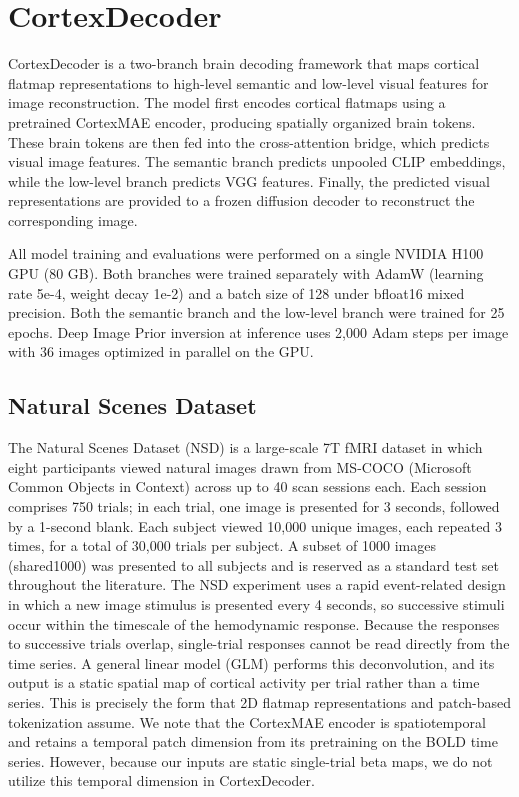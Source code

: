 \section{CortexDecoder}
\label{sec:cortex_decoder}
CortexDecoder is a two-branch brain decoding framework that maps cortical flatmap representations to high-level semantic and low-level visual features for image reconstruction. The model first encodes cortical flatmaps using a pretrained CortexMAE encoder, producing spatially organized brain tokens. These brain tokens are then fed into the cross-attention bridge, which predicts visual image features. The semantic branch predicts unpooled CLIP embeddings, while the low-level branch predicts VGG features. Finally, the predicted visual representations are provided to a frozen diffusion decoder to reconstruct the corresponding image.

All model training and evaluations were performed on a single NVIDIA H100 GPU (80 GB). Both branches were trained separately with AdamW \cite{loshchilov2019decoupledweightdecayregularization} (learning rate 5e-4, weight decay 1e-2) and a batch size of 128 under bfloat16 mixed precision. Both the semantic branch and the low-level branch were trained for 25 epochs. Deep Image Prior inversion at inference uses 2,000 Adam steps per image with 36 images optimized in parallel on the GPU.

\subsection{Natural Scenes Dataset}

The Natural Scenes Dataset (NSD) is a large-scale 7T fMRI dataset in which eight participants viewed natural images drawn from MS-COCO (Microsoft Common Objects in Context) \cite{lin2015microsoftcococommonobjects} across up to 40 scan sessions each. Each session comprises 750 trials; in each trial, one image is presented for 3 seconds, followed by a 1-second blank. Each subject viewed 10,000 unique images, each repeated 3 times, for a total of 30,000 trials per subject. A subset of 1000 images (shared1000) was presented to all subjects and is reserved as a standard test set throughout the literature.
The NSD experiment uses a rapid event-related design in which a new image stimulus is presented every 4 seconds, so successive stimuli occur within the timescale of the hemodynamic response. Because the responses to successive trials overlap, single-trial responses cannot be read directly from the time series. A general linear model (GLM) \cite{10.7554/eLife.77599} performs this deconvolution, and its output is a static spatial map of cortical activity per trial rather than a time series. This is precisely the form that 2D flatmap representations and patch-based tokenization assume. We note that the CortexMAE encoder is spatiotemporal and retains a temporal patch dimension from its pretraining on the BOLD time series. However, because our inputs are static single-trial beta maps, we do not utilize this temporal dimension in CortexDecoder.

